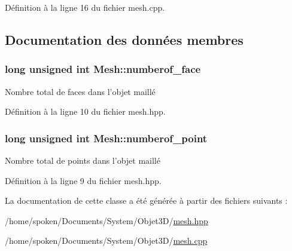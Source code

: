 Définition à la ligne 16 du fichier mesh.\-cpp.



\subsection{Documentation des données membres}
\hypertarget{class_mesh_a82d6983d05490dd70b4daef4e9434d3b}{
\subsubsection[{numberof\-\_\-face}]{\setlength{\rightskip}{0pt plus 5cm}long unsigned int Mesh\-::numberof\-\_\-face\hspace{0.3cm}{\ttfamily [private]}}}\label{class_mesh_a82d6983d05490dd70b4daef4e9434d3b}
Nombre total de faces dans l'objet maillé 

Définition à la ligne 10 du fichier mesh.\-hpp.

\hypertarget{class_mesh_a26a55fa0390c41fda68fb97bf89b06be}{
\subsubsection[{numberof\-\_\-point}]{\setlength{\rightskip}{0pt plus 5cm}long unsigned int Mesh\-::numberof\-\_\-point\hspace{0.3cm}{\ttfamily [private]}}}\label{class_mesh_a26a55fa0390c41fda68fb97bf89b06be}
Nombre total de points dans l'objet maillé 

Définition à la ligne 9 du fichier mesh.\-hpp.



La documentation de cette classe a été générée à partir des fichiers suivants \-:\begin{DoxyCompactItemize}
\item 
/home/spoken/\-Documents/\-System/\-Objet3\-D/\hyperlink{mesh_8hpp}{mesh.\-hpp}\item 
/home/spoken/\-Documents/\-System/\-Objet3\-D/\hyperlink{mesh_8cpp}{mesh.\-cpp}\end{DoxyCompactItemize}
